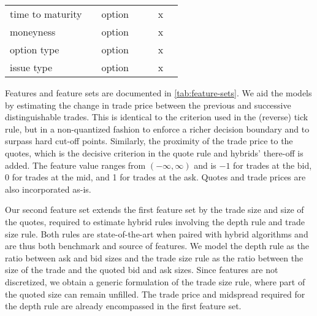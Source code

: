 \begin{ThreePartTable}
\begin{longtable}{@{}lllllll@{}}
            time to maturity        &                                                                                                  & option               & &  & x           \\
            moneyness               &                                                                                                  & option               & &  & x           \\
            option type             &                                                                                                  & option               & &  & x           \\
            issue type              &                                                                                                  & option               & &  & x           \\ \bottomrule
        \end{longtable}
\end{ThreePartTable}


Features and feature sets are documented in \cref{tab:feature-sets}. 
We aid the models by estimating the change in trade price between the previous and successive distinguishable trades. This is identical to the criterion used in the (reverse) tick rule, but in a non-quantized fashion to enforce a richer decision boundary and to surpass hard cut-off points. Similarly, the proximity of the trade price to the quotes, which is the decisive criterion in the quote rule and hybrids' there-off is added. The feature value ranges from $\left(-\infty,\infty\right)$ and is $-1$ for trades at the bid, 0 for trades at the mid, and 1 for trades at the ask. Quotes and trade prices are also incorporated as-is.


Our second feature set extends the first feature set by the trade size and size of the quotes, required to estimate hybrid rules involving the depth rule and trade size rule. Both rules are state-of-the-art when paired with hybrid algorithms and are thus both benchmark and source of features. We model the depth rule as the ratio between ask and bid sizes and the trade size rule as the ratio between the size of the trade and the quoted bid and ask sizes. Since features are not discretized, we obtain a generic formulation of the trade size rule, where part of the quoted size can remain unfilled. The trade price and midspread required for the depth rule are already encompassed in the first feature set.

